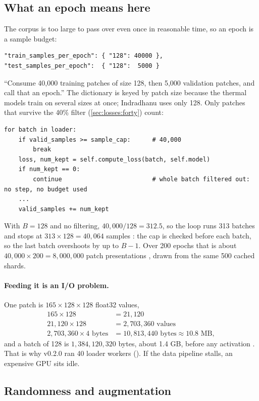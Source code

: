 \subsection{What an epoch means here}\label{sec:trainloop:epoch}

The corpus is too large to pass over even once in reasonable time, so an epoch is a sample
budget:
\begin{lstlisting}[language={}]
"train_samples_per_epoch": { "128": 40000 },
"test_samples_per_epoch":  { "128":  5000 }
\end{lstlisting}
``Consume 40,000 training patches of size 128, then 5,000 validation patches, and call that an
epoch.'' The dictionary is keyed by patch size because the thermal models train on several sizes
at once; Indradhanu uses only 128. Only patches that survive the 40\% filter
(\cref{sec:losses:forty}) count:
\begin{lstlisting}
for batch in loader:
    if valid_samples >= sample_cap:      # 40,000
        break
    loss, num_kept = self.compute_loss(batch, self.model)
    if num_kept == 0:
        continue                         # whole batch filtered out: no step, no budget used
    ...
    valid_samples += num_kept
\end{lstlisting}
With $B = 128$ and no filtering, $40{,}000/128 = 312.5$, so the loop runs 313 batches and stops
at $313 \times 128 = 40{,}064$ samples \tagC: the cap is checked before each batch, so the last
batch overshoots by up to $B - 1$. Over 200 epochs that is about $40{,}000 \times 200 =
8{,}000{,}000$ patch presentations \tagC, drawn from the same 500 cached shards.

\paragraph{Feeding it is an I/O problem.} One patch is $165 \times 128 \times 128$ float32 values,
\begin{align*}
165 \times 128 &= 21{,}120\\
21{,}120 \times 128 &= 2{,}703{,}360 \text{ values}\\
2{,}703{,}360 \times 4 \text{ bytes} &= 10{,}813{,}440 \text{ bytes} \approx 10.8 \text{ MB},
\end{align*}
and a batch of 128 is $1{,}384{,}120{,}320$ bytes, about 1.4 GB, before any activation \tagC.
That is why v0.2.0 ran 40 loader workers (). If the data pipeline stalls, an
expensive GPU sits idle.

\subsection{Randomness and augmentation}

